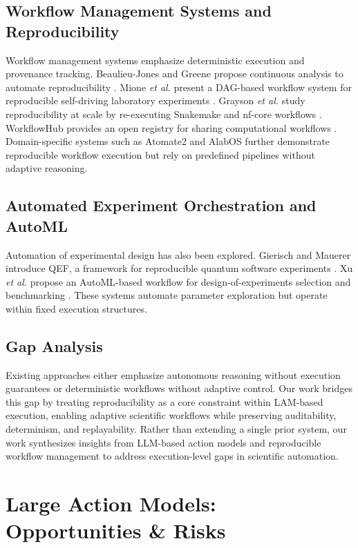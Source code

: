 \documentclass[conference]{IEEEtran}
\begin{document}
\subsection{Workflow Management Systems and Reproducibility}

Workflow management systems emphasize deterministic execution and provenance tracking. Beaulieu-Jones and Greene propose continuous analysis to automate reproducibility \cite{beaulieu2017reproducibility}. Mione \textit{et al.} present a DAG-based workflow system for reproducible self-driving laboratory experiments \cite{mione2024workflow}. Grayson \textit{et al.} study reproducibility at scale by re-executing Snakemake and nf-core workflows \cite{grayson2023snakemake}. WorkflowHub provides an open registry for sharing computational workflows \cite{goble2025workflowhub}. Domain-specific systems such as Atomate2 \cite{rich2025atomate2} and AlabOS \cite{fei2024alabos} further demonstrate reproducible workflow execution but rely on predefined pipelines without adaptive reasoning.

\subsection{Automated Experiment Orchestration and AutoML}

Automation of experimental design has also been explored. Gierisch and Mauerer introduce QEF, a framework for reproducible quantum software experiments \cite{gierisch2025qef}. Xu \textit{et al.} propose an AutoML-based workflow for design-of-experiments selection and benchmarking \cite{xu2024automl}. These systems automate parameter exploration but operate within fixed execution structures.

\subsection{Gap Analysis}

Existing approaches either emphasize autonomous reasoning without execution guarantees or deterministic workflows without adaptive control. Our work bridges this gap by treating reproducibility as a core constraint within LAM-based execution, enabling adaptive scientific workflows while preserving auditability, determinism, and replayability. Rather than extending a single prior system, our work synthesizes insights from LLM-based action models and reproducible workflow management to address execution-level gaps in scientific automation.

\section{Large Action Models: Opportunities \& Risks}
\end{document}
